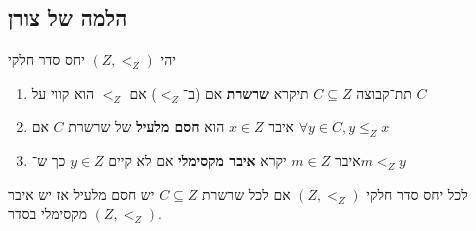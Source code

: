 \subsection{הלמה של צורן}
\begin{definition}
	יהי $(Z, <_Z)$ יחס סדר חלקי
	\begin{enumerate}
		\item תת־קבוצה $C \subseteq Z$ תיקרא \textbf{שרשרת} אם (ב־$<_Z$) אם $<_Z$ הוא קווי על $C$
		\item איבר $x \in Z$ הוא \textbf{חסם מלעיל} של שרשרת $C$ אם $\forall y \in C, y \le_Z x$
		\item איבר $m \in Z$ יקרא \textbf{איבר מקסימלי} אם לא קיים $y \in Z$ כך ש־$m <_Z y$
	\end{enumerate}
\end{definition}
\begin{definition}
	לכל יחס סדר חלקי $(Z, <_Z)$ אם לכל שרשרת $C \subseteq Z$ יש חסם מלעיל אז יש איבר מקסימלי בסדר $(Z, <_Z)$.
\end{definition}


